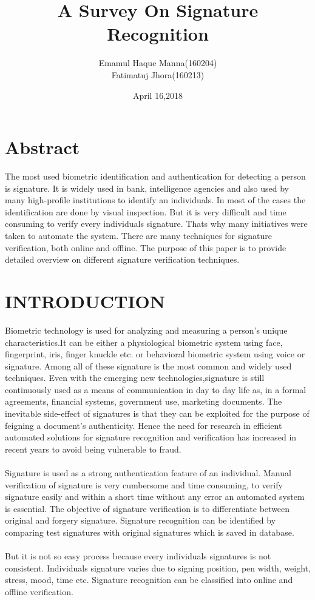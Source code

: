 \documentclass[]{article}
\title{\textbf{A Survey On Signature Recognition}}
\author{Emamul Haque Manna(160204)\\Fatimatuj Jhora(160213)}
\date{April 16,2018}
\begin{document}
	\maketitle
	\newpage
	\section*{Abstract}
	The most used biometric identification and authentication for detecting a person is signature. It is widely used in bank, intelligence agencies and also used by many high-profile institutions to identify an individuals. In most of the cases the identification are done by visual inspection\cite{bib1}. But it is very difficult and time consuming to verify every individuals signature. Thats why many initiatives were taken to automate the system. There are many techniques for signature verification, both online and offline. The purpose of this paper is to provide detailed overview on different signature verification techniques.
	\section{INTRODUCTION}
	Biometric technology is used for analyzing and measuring a person's unique characteristics.It can be either a physiological biometric system using face, fingerprint, iris, finger knuckle etc. or behavioral biometric system using voice or signature\cite{bib1}. Among all of these signature is the most common and widely used techniques. Even with the emerging new technologies,signature is still continuously used as a means of communication in day to day life as, in a formal agreements, financial systems, government use, marketing documents. The inevitable
	side-effect of signatures is that they can be exploited for the purpose of feigning a document’s authenticity\cite{bib2}. Hence the need for research in efficient automated solutions for signature recognition and verification has increased in
	recent years to avoid being vulnerable to fraud\cite{bib2}.\\\\
	Signature is used as a strong authentication feature of an individual. Manual verification of signature is very cumbersome and time consuming, to verify signature easily and within a short time without any error an automated system is essential. The objective of signature verification is to differentiate between original and forgery signature. Signature recognition can be identified by comparing test signatures with original signatures which is saved in database.\\\\
	But it is not so easy process because every individuals signatures is not consistent. Individuals signature varies due to signing position, pen width, weight, stress, mood, time etc. Signature recognition can be classified into online and offline verification.
\end{document}
